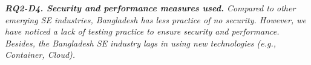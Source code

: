 \begin{tcolorbox}[flushleft upper,boxrule=1pt,arc=0pt,left=0pt,right=0pt,top=0pt,bottom=0pt,colback=white,after=\ignorespacesafterend\par\noindent]
\nd\it{\bf{RQ2-D4. Security and performance measures used.}}
Compared to other emerging SE industries, Bangladesh has less practice of no
security. However, we have noticed a lack of testing practice to ensure security
and performance. Besides, the Bangladesh SE industry lags in using new
technologies (e.g., Container, Cloud).
\end{tcolorbox}
